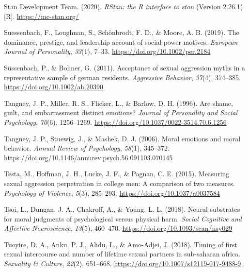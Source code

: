 \documentclass[
  donotrepeattitle,doc, 12pt, a4paper,floatsintext]{apa7}
\newlength{\cslhangindent}
\newlength{\cslentryspacingunit} %
\newenvironment{CSLReferences}[2] %
 {%
  \setlength{\parindent}{0pt}
  \ifodd #1
  \let\oldpar\par
  \def\par{\hangindent=\cslhangindent\oldpar}
  \fi
  \setlength{\parskip}{#2\cslentryspacingunit}
 }%
 {}
\begin{document}
\begin{CSLReferences}{1}{0}
\leavevmode{}%
Stan Development Team. (2020). \emph{RStan: the R interface to stan} (Version 2.26.1) {[}R{]}. \url{https://mc-stan.org/}

\leavevmode{}%
Suessenbach, F., Loughnan, S., Schönbrodt, F. D., \& Moore, A. B. (2019). The dominance, prestige, and leadership account of social power motives. \emph{European Journal of Personality}, \emph{33}(1), 7--33. \url{https://doi.org/10.1002/per.2184}

\leavevmode{}%
Süssenbach, P., \& Bohner, G. (2011). Acceptance of sexual aggression myths in a representative sample of german residents. \emph{Aggressive Behavior}, \emph{37}(4), 374--385. \url{https://doi.org/10.1002/ab.20390}

\leavevmode{}%
Tangney, J. P., Miller, R. S., Flicker, L., \& Barlow, D. H. (1996). Are shame, guilt, and embarrassment distinct emotions? \emph{Journal of Personality and Social Psychology}, \emph{70}(6), 1256--1269. \url{https://doi.org/10.1037/0022-3514.70.6.1256}

\leavevmode{}%
Tangney, J. P., Stuewig, J., \& Mashek, D. J. (2006). Moral emotions and moral behavior. \emph{Annual Review of Psychology}, \emph{58}(1), 345--372. \url{https://doi.org/10.1146/annurev.psych.56.091103.070145}

\leavevmode{}%
Testa, M., Hoffman, J. H., Lucke, J. F., \& Pagnan, C. E. (2015). Measuring sexual aggression perpetration in college men: A comparison of two measures. \emph{Psychology of Violence}, \emph{5}(3), 285--293. \url{https://doi.org/10.1037/a0037584}

\leavevmode{}%
Tsoi, L., Dungan, J. A., Chakroff, A., \& Young, L. L. (2018). Neural substrates for moral judgments of psychological versus physical harm. \emph{Social Cognitive and Affective Neuroscience}, \emph{13}(5), 460--470. \url{https://doi.org/10.1093/scan/nsy029}

\leavevmode{}%
Tuoyire, D. A., Anku, P. J., Alidu, L., \& Amo-Adjei, J. (2018). Timing of first sexual intercourse and number of lifetime sexual partners in sub-saharan africa. \emph{Sexuality \& Culture}, \emph{22}(2), 651--668. \url{https://doi.org/10.1007/s12119-017-9488-9}


\end{CSLReferences}
\end{document}
